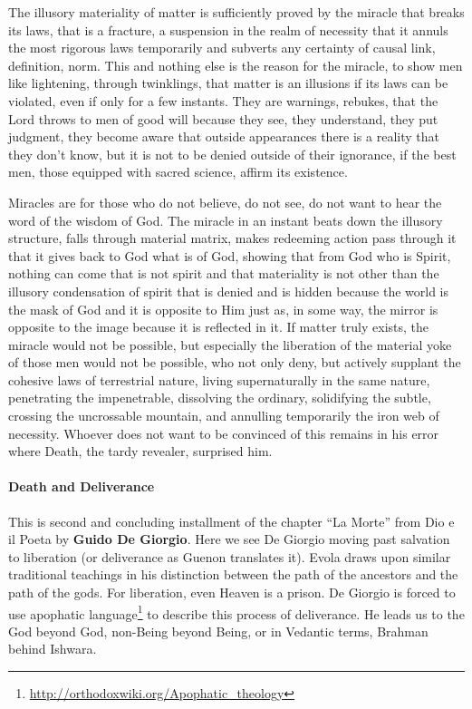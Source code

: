 The illusory materiality of matter is sufficiently proved by the miracle that breaks its laws, that is a fracture, a suspension in the realm of necessity that it annuls the most rigorous laws temporarily and subverts any certainty of causal link, definition, norm. This and nothing else is the reason for the miracle, to show men like lightening, through twinklings, that matter is an illusions if its laws can be violated, even if only for a few instants. They are warnings, rebukes, that the Lord throws to men of good will because they see, they understand, they put judgment, they become aware that outside appearances there is a reality that they don't know, but it is not to be denied outside of their ignorance, if the best men, those equipped with sacred science, affirm its existence.

Miracles are for those who do not believe, do not see, do not want to hear the word of the wisdom of God. The miracle in an instant beats down the illusory structure, falls through material matrix, makes redeeming action pass through it that it gives back to God what is of God, showing that from God who is Spirit, nothing can come that is not spirit and that materiality is not other than the illusory condensation of spirit that is denied and is hidden because the world is the mask of God and it is opposite to Him just as, in some way, the mirror is opposite to the image because it is reflected in it. If matter truly exists, the miracle would not be possible, but especially the liberation of the material yoke of those men would not be possible, who not only deny, but actively supplant the cohesive laws of terrestrial nature, living supernaturally in the same nature, penetrating the impenetrable, dissolving the ordinary, solidifying the subtle, crossing the uncrossable mountain, and annulling temporarily the iron web of necessity. Whoever does not want to be convinced of this remains in his error where Death, the tardy revealer, surprised him.

\paragraph{Death and Deliverance}

\begin{quotex}
This is second and concluding installment of the chapter ``La Morte'' from Dio e il Poeta by \textbf{Guido De Giorgio}. Here we see De Giorgio moving past salvation to liberation (or deliverance as Guenon translates it). Evola draws upon similar traditional teachings in his distinction between the path of the ancestors and the path of the gods. For liberation, even Heaven is a prison. De Giorgio is forced to use apophatic language\footnote{\url{http://orthodoxwiki.org/Apophatic\_theology}} to describe this process of deliverance. He leads us to the God beyond God, non-Being beyond Being, or in Vedantic terms, Brahman behind Ishwara.
\end{quotex}


